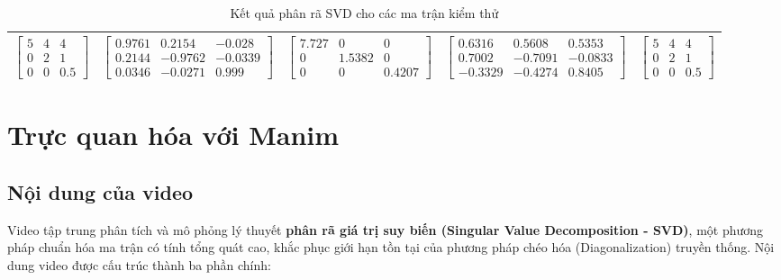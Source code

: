 \begin{table}[h!]
{\begin{tabular}{|c|c|c|c|c|}
        $\begin{bmatrix}
        5 & 4 & 4\\
        0 & 2 & 1\\
        0 & 0 & 0.5
        \end{bmatrix}$ &
        $\begin{bmatrix}
        0.9761 & 0.2154 & -0.028\\
        0.2144 & -0.9762 & -0.0339\\
        0.0346 & -0.0271 & 0.999
        \end{bmatrix}$ &
        $\begin{bmatrix}
        7.727 & 0 & 0\\
        0 & 1.5382 & 0\\
        0 & 0 & 0.4207
        \end{bmatrix}$ &
        $\begin{bmatrix}
        0.6316 & 0.5608 & 0.5353\\
        0.7002 & -0.7091 & -0.0833\\
        -0.3329 & -0.4274 & 0.8405
        \end{bmatrix}$ &
        $\begin{bmatrix}
        5 & 4 & 4\\
        0 & 2 & 1\\
        0 & 0 & 0.5
        \end{bmatrix}$ \\ 
        \hline
        
    \end{tabular}
    }
    \caption{Kết quả phân rã SVD cho các ma trận kiểm thử}
\end{table}

\newpage

\section{Trực quan hóa với Manim}

\subsection{Nội dung của video}

Video tập trung phân tích và mô phỏng lý thuyết \textbf{phân rã giá trị suy biến (Singular Value Decomposition - SVD)}, một phương pháp chuẩn hóa ma trận có tính tổng quát cao, khắc phục giới hạn tồn tại của phương pháp chéo hóa (Diagonalization) truyền thống. Nội dung video được cấu trúc thành ba phần chính:

